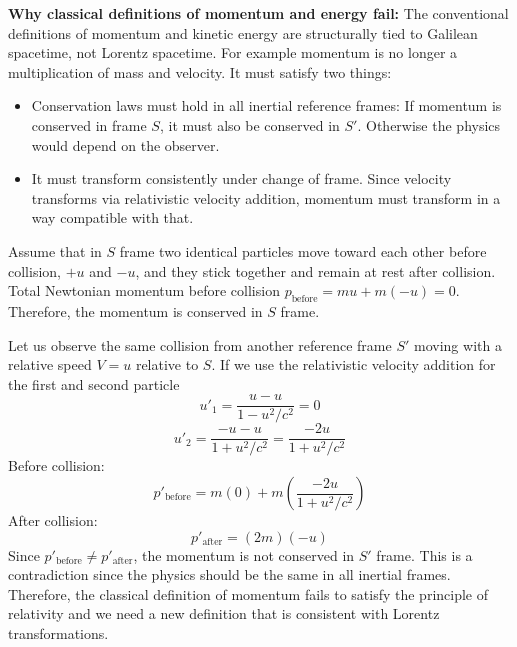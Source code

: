 \documentclass[12pt]{article}
\begin{document}
\begin{tcolorbox}[colback=yellow!20, colframe=black]
\textbf{Why classical definitions of momentum and energy fail:} 
The conventional definitions of momentum and kinetic energy are structurally tied to Galilean spacetime, not Lorentz spacetime. For example momentum is no longer a multiplication of mass and velocity. It must satisfy two things:
\begin{itemize}
    \item Conservation laws must hold in all inertial reference frames: If momentum is conserved in frame $S$, it must also be conserved in $S'$. Otherwise the physics would depend on the observer.
    \item It must transform consistently under change of frame. Since velocity transforms via relativistic velocity addition, momentum must transform in a way compatible with that.
\end{itemize}
Assume that in $S$ frame two identical particles move toward each other before collision, $+u$ and $-u$, and they stick together and remain at rest after collision. Total Newtonian momentum before collision $p_\text{before}=mu+m(-u)=0$. Therefore, the momentum is conserved in $S$ frame. 

Let us observe the same collision from another reference frame $S'$ moving with a relative speed $V=u$ relative to $S$. If we use the relativistic velocity addition for the first and second particle
\[
u'_1=\frac{u-u}{1-u^2/c^2}=0
\]
\[
u'_2=\frac{-u-u}{1+u^2/c^2}=\frac{-2u}{1+u^2/c^2}
\]
Before collision:
\[
p'_\text{before} = m(0)+m\left(\frac{-2u}{1+u^2/c^2}\right)
\]
After collision:
\[
p'_\text{after} = (2m)(-u)
\]
Since $p'_\text{before} \neq p'_\text{after}$, the momentum is not conserved in $S'$ frame. This is a contradiction since the physics should be the same in all inertial frames. Therefore, the classical definition of momentum fails to satisfy the principle of relativity and we need a new definition that is consistent with Lorentz transformations.
\end{tcolorbox}
\end{document}
